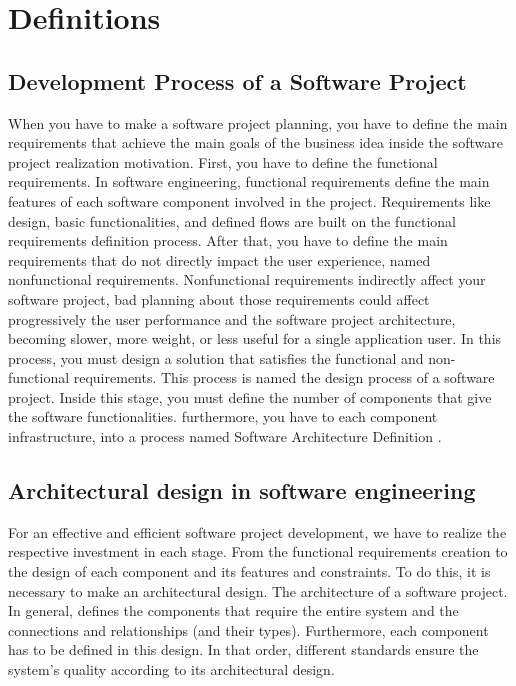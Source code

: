 
\chapter{Definitions}
\label{cha:definitions}

\section{Development Process of a Software Project}
When you have to make a software project planning, you have to define the main requirements that achieve the main goals of the business idea inside the software project realization motivation. First, you have to define the functional requirements. In software engineering, functional requirements define the main features of each software component involved in the project. Requirements like design, basic functionalities, and defined flows are built on the functional requirements definition process.
After that, you have to define the main requirements that do not directly impact the user experience, named nonfunctional requirements. Nonfunctional requirements indirectly affect your software project, bad planning about those requirements could affect progressively the user performance and the software project architecture, becoming slower, more weight, or less useful for a single application user. In this process, you must design a solution that satisfies the functional and non-functional requirements. This process is named the design process of a software project. Inside this stage, you must define the number of components that give the software functionalities. furthermore, you have to each component infrastructure, into a process named Software Architecture Definition \citet{software-engineering-book}.  

\section{Architectural design in software engineering}
For an effective and efficient software project development, we have to realize the respective investment in each stage. From the functional requirements creation to the design of each component and its features and constraints. To do this, it is necessary to make an architectural design. The architecture of a software project. In general, defines the components that require the entire system and the connections and relationships (and their types). Furthermore, each component has to be defined in this design. In that order, different standards ensure the system’s quality according to its architectural design.

